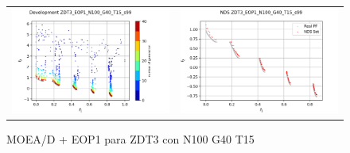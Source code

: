 \begin{figure}[H]
\begin{tabular}{c c}
    \includegraphics[scale=0.5]{figures/ZDT3_EOP1_N100_G40_T15/s99_dev.png} &
    \includegraphics[scale=0.5]{figures/ZDT3_EOP1_N100_G40_T15/s99_nds.png}\\
    \end{tabular}
    \caption{MOEA/D + EOP1 para ZDT3 con N100 G40 T15 }
    \label{fig:10}
\end{figure}

